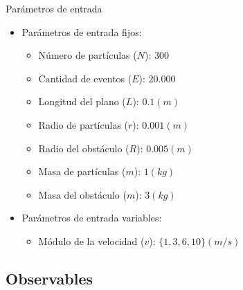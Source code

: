 \documentclass{beamer}
\begin{document}
            \begin{frame}{Parámetros de entrada}
                \begin{itemize}
                    \item Parámetros de entrada fijos:
                    \begin{itemize}
                        \item Número de partículas ($N$): \alert{$300$}
                        \item Cantidad de eventos ($E$): \alert{$20.000$}
                        \item Longitud del plano ($L$): \alert{$0.1(m)$}
                        \item Radio de partículas ($r$): \alert{$0.001(m)$}
                        \item Radio del obstáculo ($R$): \alert{$0.005(m)$}
                        \item Masa de partículas ($m$): \alert{$1(kg)$}
                        \item Masa del obstáculo ($m$): \alert{$3(kg)$}
                    \end{itemize}
                    \item Parámetros de entrada variables:
                    \begin{itemize}
                        \item Módulo de la velocidad ($v$): \alert{$\{1, 3, 6, 10\}(m/s)$}
                    \end{itemize}
                \end{itemize}
            \end{frame}

        \subsection{Observables}
\end{document}
